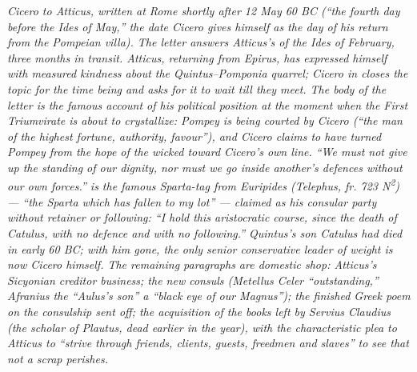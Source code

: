 
\textit{Cicero to Atticus, written at Rome shortly after 12
May 60 BC (``the fourth day before the Ides of May,'' the
date Cicero gives himself as the day of his return from the
Pompeian villa). The letter answers Atticus's of the Ides of
February, three months in transit. Atticus, returning from
Epirus, has expressed himself with measured kindness about
the Quintus--Pomponia quarrel; Cicero in 
closes the topic for the time being and asks for it to wait
till they meet. The body of the letter is the famous account
of his political position at the moment when the First
Triumvirate is about to crystallize: Pompey is being courted
by Cicero (``the man of the highest fortune, authority,
favour''), and Cicero claims to have turned Pompey from the
hope of the wicked toward Cicero's own line. ``We must not
give up the standing of our dignity, nor must we go inside
another's defences without our own forces.'' 
is the famous Sparta-tag from Euripides (Telephus,
fr. 723 N\textsuperscript{2}) --- ``the Sparta which has
fallen to my lot'' --- claimed as his consular party
without retainer or following: ``I hold this aristocratic
course, since the death of Catulus, with no defence and with
no following.'' Quintus's son Catulus had died in early 60
BC; with him gone, the only senior conservative leader of
weight is now Cicero himself. The remaining paragraphs are
domestic shop: Atticus's Sicyonian creditor business; the
new consuls (Metellus Celer ``outstanding,'' Afranius the
``Aulus's son'' a ``black eye of our Magnus''); the
finished Greek poem on the consulship sent off; the
acquisition of the books left by Servius Claudius (the
scholar of Plautus, dead earlier in the year), with the
characteristic plea to Atticus to ``strive through friends,
clients, guests, freedmen and slaves'' to see that not a
scrap perishes.}
